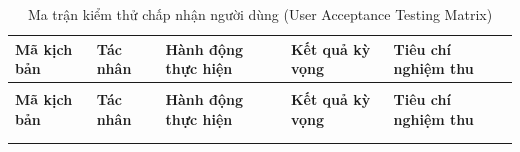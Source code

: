 \begingroup
\singlespacing
\small
\renewcommand{\arraystretch}{1.2}
\begin{xltabular}{\textwidth}{|>{\centering\arraybackslash}p{1.4cm}|>{\raggedright\arraybackslash}p{1.8cm}|>{\raggedright\arraybackslash}X|>{\raggedright\arraybackslash}X|>{\centering\arraybackslash}p{1.6cm}|}
\caption{Ma trận kiểm thử chấp nhận người dùng (User Acceptance Testing Matrix)} \label{tab:uat_matrix} \\
\hline
\textbf{Mã kịch bản} & \textbf{Tác nhân} & \textbf{Hành động thực hiện} & \textbf{Kết quả kỳ vọng} & \textbf{Tiêu chí nghiệm thu} \\ \hline
\endfirsthead

 \\
\hline
\textbf{Mã kịch bản} & \textbf{Tác nhân} & \textbf{Hành động thực hiện} & \textbf{Kết quả kỳ vọng} & \textbf{Tiêu chí nghiệm thu} \\ \hline
\endhead

\hline
{} \\
\endfoot

\hline
\endlastfoot


\end{xltabular}
